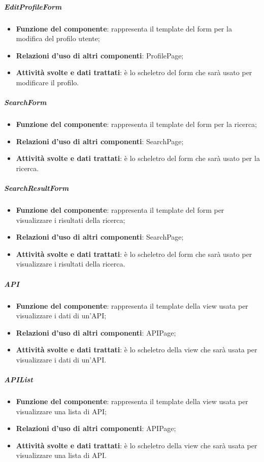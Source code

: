 \subparagraph{EditProfileForm}
\begin{itemize}
	\item \textbf{Funzione del componente}: rappresenta il template del form per la modifica del profilo utente;
	\item \textbf{Relazioni d’uso di altri componenti}: ProfilePage;
	\item \textbf{Attività svolte e dati trattati}: \`{e} lo scheletro del form che sar\`{a} usato per modificare il profilo.
\end{itemize}

\subparagraph{SearchForm}
\begin{itemize}
	\item \textbf{Funzione del componente}: rappresenta il template del form per la ricerca;
	\item \textbf{Relazioni d’uso di altri componenti}: SearchPage;
	\item \textbf{Attività svolte e dati trattati}:  \`{e} lo scheletro del form che sar\`{a} usato per la ricerca.
\end{itemize}

\subparagraph{SearchResultForm}
\begin{itemize}
	\item \textbf{Funzione del componente}: rappresenta il template del form per visualizzare i risultati della ricerca;
	\item \textbf{Relazioni d’uso di altri componenti}: SearchPage;
	\item \textbf{Attività svolte e dati trattati}: \`{e} lo scheletro del form che sar\`{a} usato per visualizzare i risultati della ricerca.
\end{itemize}

\subparagraph{API}
\begin{itemize}
	\item \textbf{Funzione del componente}:  rappresenta il template della view usata per visualizzare i dati di un'API;
	\item \textbf{Relazioni d’uso di altri componenti}: APIPage;
	\item \textbf{Attività svolte e dati trattati}: \`{e} lo scheletro della view che sar\`{a} usata per visualizzare i dati di un'API.
\end{itemize}

\subparagraph{APIList}
\begin{itemize}
	\item \textbf{Funzione del componente}: rappresenta il template della view usata per visualizzare una lista di API;
	\item \textbf{Relazioni d’uso di altri componenti}: APIPage;
	\item \textbf{Attività svolte e dati trattati}: \`{e} lo scheletro della view che sar\`{a} usata per visualizzare una lista di API.
\end{itemize}

